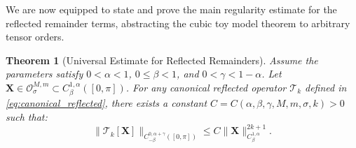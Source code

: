 \documentclass{amsart}
\newtheorem{theorem}{Theorem}[section]
\begin{document}
We are now equipped to state and prove the main regularity estimate for the reflected remainder terms, abstracting the cubic toy model theorem to arbitrary tensor orders.

\begin{theorem}[Universal Estimate for Reflected Remainders]\label{thm:universal_reflected}
Assume the parameters satisfy $0<\alpha<1$, $0 \le \beta < 1$, and $0 < \gamma < 1-\alpha$. Let $\mathbf{X} \in \mathcal{O}^{M,m}_\sigma \subset C^{1,\alpha}_\beta([0,\pi])$. For any canonical reflected operator $\mathcal{T}_k$ defined in \eqref{eq:canonical_reflected}, there exists a constant $C = C(\alpha,\beta,\gamma, M, m, \sigma, k)>0$ such that:
\begin{equation}
\|\mathcal{T}_k[\mathbf{X}]\|_{C^{0,\alpha+\gamma}_{-\beta}([0,\pi])} \le C \|\mathbf{X}\|_{C^{1,\alpha}_\beta}^{2k+1}.
\end{equation}
\end{theorem}
\end{document}
